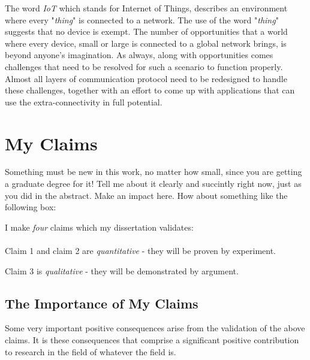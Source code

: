 \label{chapter:introduction}

The word \textit{IoT} which stands for Internet of Things, describes an environment where every "\textit{thing}" is connected to a network. The use of the word "\textit{thing}" suggests that no device is exempt. The number of opportunities that a world where every device, small or large is connected to a global network brings, is beyond anyone's imagination. As always, along with opportunities comes challenges that need to be resolved for such a scenario to function properly. Almost all layers of communication protocol need to be redesigned to handle these challenges, together with an effort to come up with applications that can use the extra-connectivity in full potential.
\section{My Claims}
Something must be new in this work, no matter how small, since you are getting a graduate degree for it! Tell me about it clearly and succintly right now, just as you did in the abstract. Make an impact here. How about something like the following box:

I make \textit{four} claims which
my dissertation validates:
\\

\\

\noindent Claim 1 and claim 2 are \textit{quantitative} - they will be proven by experiment.

\noindent Claim 3 is \textit{qualitative} - they will be demonstrated by argument.

\subsection{The Importance of My Claims}

Some very important positive consequences
arise from the validation of the above claims.
It is these consequences that comprise a significant
positive contribution to research in the field
of whatever the field is.
\\

